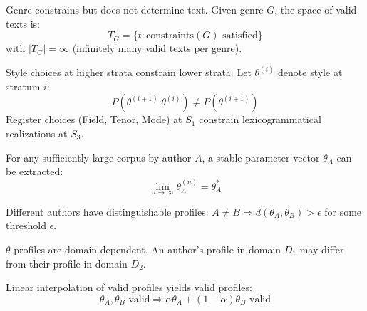 \begin{axiom}
\label{ax:swsm-8}
Genre constrains but does not determine text. Given genre $G$, the space of valid texts is:
\begin{equation}
T_G = \{t : \text{constraints}(G) \text{ satisfied}\}
\end{equation}
with $|T_G| = \infty$ (infinitely many valid texts per genre).
\end{axiom}

\begin{axiom}
\label{ax:swsm-9}
Style choices at higher strata constrain lower strata. Let $\theta^{(i)}$ denote style at stratum $i$:
\begin{equation}
P(\theta^{(i+1)} | \theta^{(i)}) \neq P(\theta^{(i+1)})
\end{equation}
Register choices (Field, Tenor, Mode) at $S_1$ constrain lexicogrammatical realizations at $S_3$.
\end{axiom}

\begin{axiom}
\label{ax:swsm-10}
For any sufficiently large corpus by author $A$, a stable parameter vector $\theta_A$ can be extracted:
\begin{equation}
\lim_{n \rightarrow \infty} \theta_A^{(n)} = \theta_A^*
\end{equation}
\end{axiom}

\begin{axiom}
\label{ax:swsm-11}
Different authors have distinguishable profiles: $A \neq B \Rightarrow d(\theta_A, \theta_B) > \epsilon$ for some threshold $\epsilon$.
\end{axiom}

\begin{axiom}
\label{ax:swsm-12}
$\theta$ profiles are domain-dependent. An author's profile in domain $D_1$ may differ from their profile in domain $D_2$.
\end{axiom}

\begin{axiom}
\label{ax:swsm-13}
Linear interpolation of valid profiles yields valid profiles:
\begin{equation}
\theta_A, \theta_B \text{ valid} \Rightarrow \alpha\theta_A + (1-\alpha)\theta_B \text{ valid}
\end{equation}
\end{axiom}


